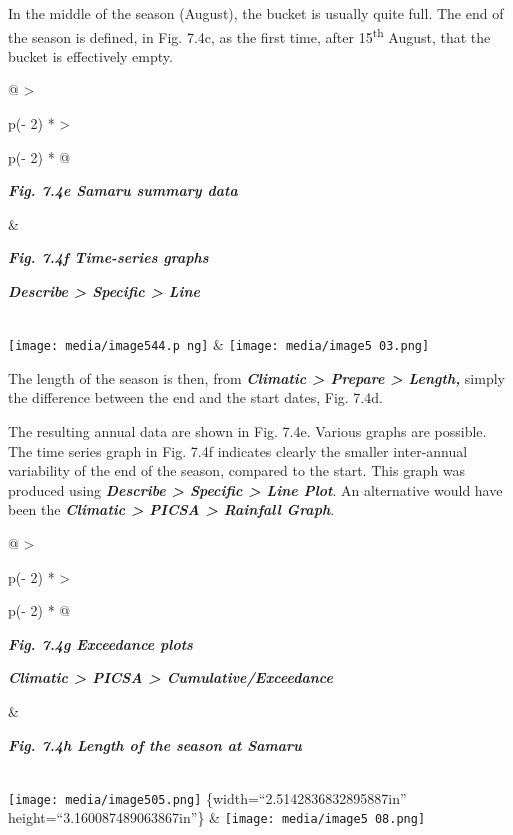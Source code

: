 \documentclass[
  letterpaper,
  DIV=11,
  numbers=noendperiod]{scrreprt}
\begin{document}
In the middle of the season (August), the bucket is usually quite full.
The end of the season is defined, in Fig. 7.4c, as the first time, after
15\textsuperscript{th} August, that the bucket is effectively empty.

\begin{longtable}[]{@{}
  >{\raggedright\arraybackslash}p{(\columnwidth - 2\tabcolsep) * }
  >{\raggedright\arraybackslash}p{(\columnwidth - 2\tabcolsep) * }@{}}
\toprule\noalign{}
\begin{minipage}[b]{\linewidth}\raggedright
\textbf{\emph{Fig. 7.4e Samaru summary data}}
\end{minipage} & \begin{minipage}[b]{\linewidth}\raggedright
\textbf{\emph{Fig. 7.4f Time-series graphs}}

\textbf{\emph{Describe \textgreater{} Specific \textgreater{} Line}}
\end{minipage} \\
\midrule\noalign{}
\endhead
\bottomrule\noalign{}
\endlastfoot
\texttt{[image: media/image544.p ng]}
&
\texttt{[image: media/image5 03.png]} \\
\end{longtable}

The length of the season is then, from \textbf{\emph{Climatic
\textgreater{} Prepare \textgreater{} Length,}} simply the difference
between the end and the start dates, Fig. 7.4d.

The resulting annual data are shown in Fig. 7.4e. Various graphs are
possible. The time series graph in Fig. 7.4f indicates clearly the
smaller inter-annual variability of the end of the season, compared to
the start. This graph was produced using \textbf{\emph{Describe
\textgreater{} Specific \textgreater{} Line Plot}}. An alternative would
have been the \textbf{\emph{Climatic \textgreater{} PICSA \textgreater{}
Rainfall Graph}}.

\begin{longtable}[]{@{}
  >{\raggedright\arraybackslash}p{(\columnwidth - 2\tabcolsep) * }
  >{\raggedright\arraybackslash}p{(\columnwidth - 2\tabcolsep) * }@{}}
\toprule\noalign{}
\begin{minipage}[b]{\linewidth}\raggedright
\textbf{\emph{Fig. 7.4g Exceedance plots}}

\textbf{\emph{Climatic \textgreater{} PICSA \textgreater{}
Cumulative/Exceedance}}
\end{minipage} & \begin{minipage}[b]{\linewidth}\raggedright
\textbf{\emph{Fig. 7.4h Length of the season at Samaru}}
\end{minipage} \\
\midrule\noalign{}
\endhead
\bottomrule\noalign{}
\endlastfoot
\texttt{[image: media/image505.png]} \{width=``2.5142836832895887in''
height=``3.160087489063867in''\} &
\texttt{[image: media/image5 08.png]} \\
\end{longtable}
\end{document}
